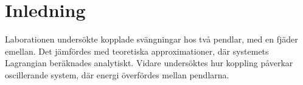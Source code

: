 \section{Inledning}
Laborationen undersökte kopplade svängningar hos två pendlar, med en fjäder emellan. Det jämfördes med teoretiska approximationer, där systemets Lagrangian beräknades analytiskt. Vidare undersöktes hur koppling påverkar oscillerande system, där energi överfördes mellan pendlarna.